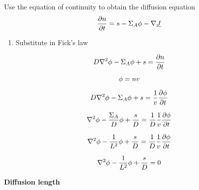 \documentclass[aspectratio=1610,pdftex,dvipsnames,compress,xcolor={dvipsnames}]{beamer}
\begin{document}
\addtocounter{framenumber}{-3} 
\begin{frame}{Use the equation of continuity to obtain the diffusion equation}
    \begin{equation}
        \small
        \frac{\partial{n}}{\partial{t}} = s - \Sigma_A \phi - \nabla \underline{J}
    \end{equation}

    \begin{enumerate}[series=outerlist,topsep=0pt,itemsep=21pt,leftmargin=*,label=(\arabic*)]
        \item[]Substitute in Fick's law
    \end{enumerate}

    \vspace*{\fill}

    \begin{equation}
        \small
        D \nabla^2 \phi - \Sigma_A \phi + s = \frac{\partial{n}}{\partial{t}}
    \end{equation}

    \vspace*{\fill}

    \begin{equation}
        \small
        \phi = nv
    \end{equation}

    \begin{equation}
        \small
        D \nabla^2 \phi - \Sigma_A \phi + s = \frac{1}{v} \frac{\partial{\phi}}{\partial{t}}
    \end{equation}

    \begin{equation}
        \small
        \nabla^2 \phi - \frac{\Sigma_A}{D} \phi + \frac{s}{D} = \frac{1}{D} \frac{1}{v} \frac{\partial{\phi}}{\partial{t}}
    \end{equation}

    \begin{equation}
        \small
        \nabla^2 \phi - \frac{1}{L^2} \phi + \frac{s}{D} = \frac{1}{D} \frac{1}{v} \frac{\partial{\phi}}{\partial{t}}
    \end{equation}

    \begin{equation}
        \small
        \nabla^2 \phi - \frac{1}{L^2} \phi + \frac{s}{D} = 0
    \end{equation}
\end{frame}


\begin{frame}[plain]{}
    \centering\LARGE\textbf{Diffusion length}
\end{frame}
\end{document}
